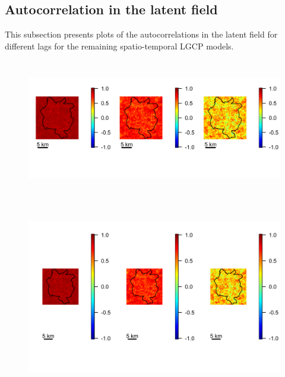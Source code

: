 \begin{appendices}
    \newpage


\section{Autocorrelation in the latent field} \label{app:latent-field}

    This subsection presents plots of the autocorrelations in the latent field for different lags for the remaining spatio-temporal LGCP models.

    \begin{figure}[H]
        \begin{center}
            \includegraphics[width = \linewidth, height = 60mm]{Autocorrelations in the Latent Field - All Cases.png}
        \end{center}
    \end{figure}

    \begin{figure}[H]
        \begin{center}
            \includegraphics[width = \linewidth, height = 80mm]{Autocorrelations in the Latent Field - Major 0.png}
        \end{center}
    \end{figure}


\end{appendices}
